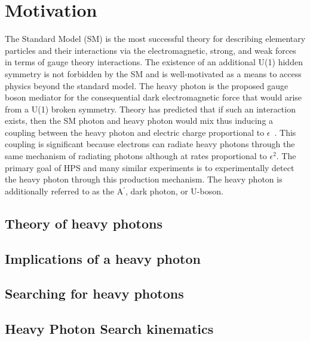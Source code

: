 \documentclass[12pt]{report}
\begin{document}
\chapter{Motivation} 
The Standard Model (SM) is the most successful theory for describing elementary particles and their interactions via the electromagnetic, strong, and weak forces in terms of gauge theory interactions. The existence of an additional U(1) hidden symmetry is not forbidden by the SM and is well-motivated as a means to access physics beyond the standard model. The heavy photon is the proposed gauge boson mediator for the consequential dark electromagnetic force that would arise from a U(1) broken symmetry. Theory has predicted that if such an interaction exists, then the SM photon and heavy photon would mix thus inducing a coupling between the heavy photon and electric charge proportional to $\epsilon$~\cite{Holdom0}. This coupling is significant because electrons can radiate heavy photons through the same mechanism of radiating photons although at rates proportional to $\epsilon^2$. The primary goal of HPS and many similar experiments is to experimentally detect the heavy photon through this production mechanism. The heavy photon is additionally referred to as the A$^{\prime}$, dark photon, or U-boson.

\section{Theory of heavy photons}


\section{Implications of a heavy photon}


\section{Searching for heavy photons}


\section{Heavy Photon Search kinematics}




\end{document}
